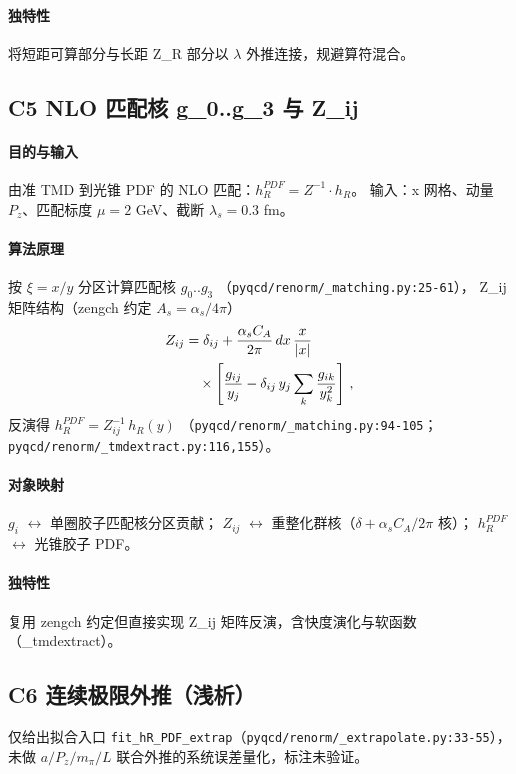 \documentclass[UTF8]{ctexart}
\begin{document}
\paragraph{独特性} 将短距可算部分与长距 Z\_R 部分以 $\lambda$ 外推连接，规避算符混合。

\subsection{C5 NLO 匹配核 g\_0..g\_3 与 Z\_ij}
\paragraph{目的与输入} 由准 TMD 到光锥 PDF 的 NLO 匹配：$h_R^{PDF}=Z^{-1}\cdot h_R$。
输入：x 网格、动量 $P_z$、匹配标度 $\mu=2$ GeV、截断 $\lambda_s=0.3$ fm。
\paragraph{算法原理} 按 $\xi=x/y$ 分区计算匹配核 $g_0..g_3$
（\textcolor{evidence}{\texttt{\nolinkurl{pyqcd/renorm/_matching.py:25-61}}}），
Z\_ij 矩阵结构（zengch 约定 $A_s=\alpha_s/4\pi$）
\begin{align}
Z_{ij} &= \delta_{ij} + \frac{\alpha_s C_A}{2\pi}\,dx\,\frac{x}{|x|} \notag\\
&\quad\times\left[\frac{g_{ij}}{y_j} - \delta_{ij}\,y_j\sum_k \frac{g_{ik}}{y_k^2}\right]\,,
\end{align}
反演得 $h_R^{PDF}=Z_{ij}^{-1}\,h_R(y)$
（\textcolor{evidence}{\texttt{\nolinkurl{pyqcd/renorm/_matching.py:94-105}}}；\texttt{\nolinkurl{pyqcd/renorm/_tmdextract.py:116,155}}）。
\paragraph{对象映射} $g_i$ $\leftrightarrow$ 单圈胶子匹配核分区贡献；
$Z_{ij}$ $\leftrightarrow$ 重整化群核（$\delta + \alpha_s C_A/2\pi$ 核）；
$h_R^{PDF}$ $\leftrightarrow$ 光锥胶子 PDF。
\paragraph{独特性} 复用 zengch 约定但直接实现 Z\_ij 矩阵反演，含快度演化与软函数（\_tmdextract）。

\subsection{C6 连续极限外推（浅析）}
仅给出拟合入口 \texttt{fit\_hR\_PDF\_extrap}（\textcolor{evidence}{\texttt{\nolinkurl{pyqcd/renorm/_extrapolate.py:33-55}}}），
未做 $a/P_z/m_\pi/L$ 联合外推的系统误差量化，标注\textcolor{warn}{未验证}。
\end{document}
